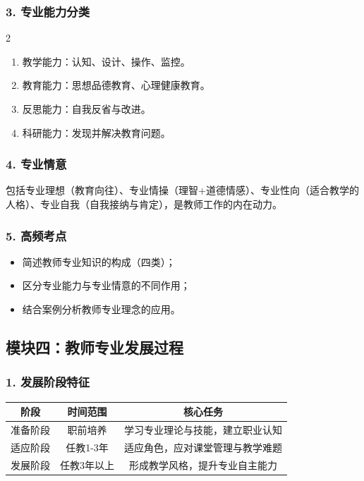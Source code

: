 \documentclass[12pt,a4paper]{article}
\begin{document}
\subsubsection{3. 专业能力分类}
\begin{multicols}{2}
\begin{enumerate}[label=•,itemsep=0.5ex]
\item 教学能力：认知、设计、操作、监控。
\item 教育能力：思想品德教育、心理健康教育。
\item 反思能力：自我反省与改进。
\item 科研能力：发现并解决教育问题。
\end{enumerate}
\end{multicols}

\subsubsection{4. 专业情意}
包括专业理想（教育向往）、专业情操（理智+道德情感）、专业性向（适合教学的人格）、专业自我（自我接纳与肯定），是教师工作的内在动力。

\subsubsection{5. 高频考点}
\begin{itemize}
    \item 简述教师专业知识的构成（四类）；
    \item 区分专业能力与专业情意的不同作用；
    \item 结合案例分析教师专业理念的应用。
\end{itemize}

\subsection{模块四：教师专业发展过程}
\subsubsection{1. 发展阶段特征}
\begin{center}
\begin{tabular}{|c|c|c|}
\hline
\textbf{阶段} & \textbf{时间范围} & \textbf{核心任务} \\
\hline
准备阶段 & 职前培养 & 学习专业理论与技能，建立职业认知 \\
\hline
适应阶段 & 任教1-3年 & 适应角色，应对课堂管理与教学难题 \\
\hline
发展阶段 & 任教3年以上 & 形成教学风格，提升专业自主能力 \\
\hline
\end{tabular}
\end{center}
\end{document}
